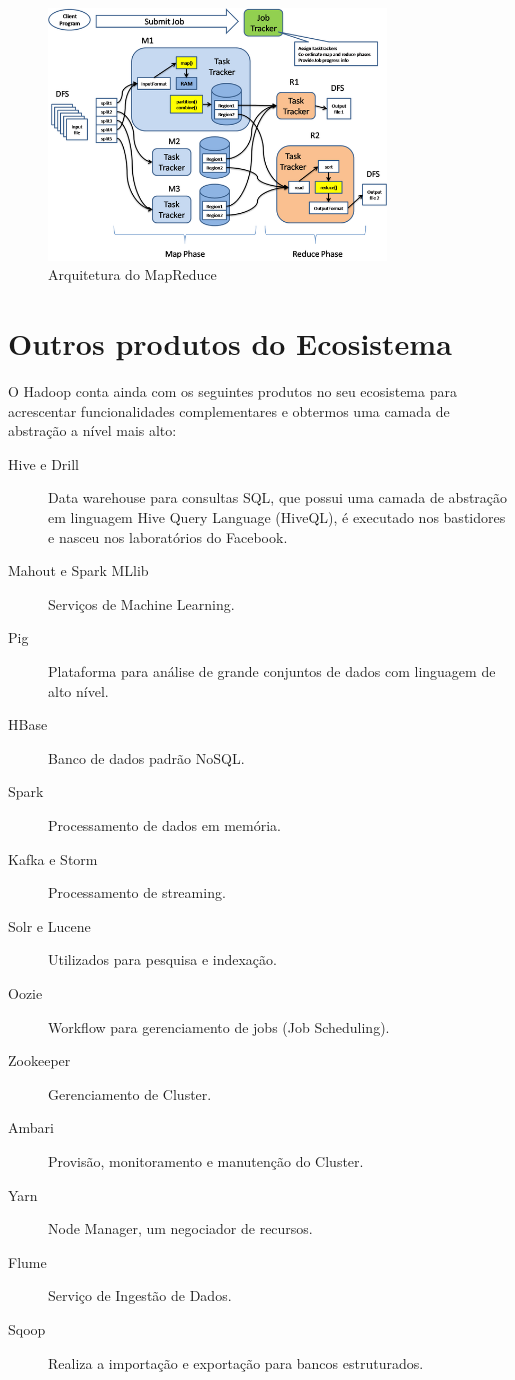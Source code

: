 \documentclass[a4paper,11pt]{article}
\begin{document}
\begin{figure}[H]
	\centering
	\includegraphics[width=0.8\textwidth]{imgHadoop/mapReduce.png}
	\caption{Arquitetura do MapReduce}
\end{figure}

\section{Outros produtos do Ecosistema}
O Hadoop conta ainda com os seguintes produtos no seu ecosistema para acrescentar funcionalidades complementares e obtermos uma camada de abstração a nível mais alto: \vspace{-1em}
\begin{description}
	\item[Hive e Drill] Data warehouse para consultas SQL, que possui uma camada de abstração em linguagem Hive Query Language (HiveQL), é executado nos bastidores e nasceu nos laboratórios do Facebook.
	\item[Mahout e Spark MLlib] Serviços de Machine Learning.
	\item[Pig] Plataforma para análise de grande conjuntos de dados com linguagem de alto nível.
	\item[HBase] Banco de dados padrão NoSQL.
	\item[Spark] Processamento de dados em memória.
	\item[Kafka e Storm] Processamento de streaming.
	\item[Solr e Lucene] Utilizados para pesquisa e indexação.
	\item[Oozie] Workflow para gerenciamento de jobs (Job Scheduling).
	\item[Zookeeper] Gerenciamento de Cluster.
	\item[Ambari] Provisão, monitoramento e manutenção do Cluster.
	\item[Yarn] Node Manager, um negociador de recursos.
	\item[Flume] Serviço de Ingestão de Dados.
	\item[Sqoop] Realiza a importação e exportação para bancos estruturados.
\end{description}
\end{document}
